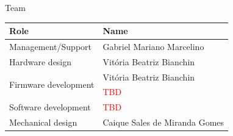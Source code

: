 
\begin{frame}{Team}

\begin{table}[!htb]
    \centering
    \label{tab:team}
    \begin{tabular}{ll}
        \toprule[1.5pt]
        \textbf{Role} & \textbf{Name} \\
        \midrule
        Management/Support                    & Gabriel Mariano Marcelino \\
        Hardware design                       & Vitória Beatriz Bianchin \\
        \multirow{2}{*}{Firmware development} & Vitória Beatriz Bianchin \\
                                              & \textcolor{red}{TBD} \\
        Software development                  & \textcolor{red}{TBD} \\
        Mechanical design                     & Caique Sales de Miranda Gomes \\
        \bottomrule[1.5pt]
    \end{tabular}
\end{table}

\end{frame}


